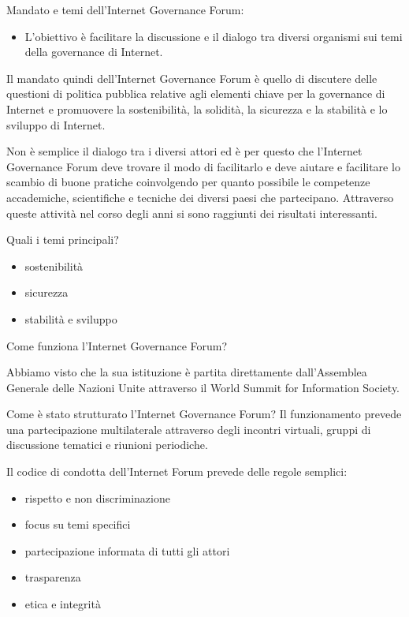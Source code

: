 Mandato e temi dell'Internet Governance Forum:
\begin{itemize}
    \item L'obiettivo è facilitare la discussione e il dialogo tra diversi organismi sui temi della governance di Internet.
\end{itemize}
Il mandato quindi dell'Internet Governance Forum è quello di discutere delle questioni di politica pubblica relative agli elementi chiave per la governance di Internet e promuovere la sostenibilità, la solidità, la sicurezza e la stabilità e lo sviluppo di Internet.\par
Non è semplice il dialogo tra i diversi attori ed è per questo che l'Internet Governance Forum deve trovare il modo di facilitarlo e deve aiutare e facilitare lo scambio di buone pratiche coinvolgendo per quanto possibile le competenze accademiche, scientifiche e tecniche dei diversi paesi che partecipano. Attraverso queste attività nel corso degli anni si sono raggiunti dei risultati interessanti.

Quali i temi principali?

\begin{itemize}
    \item sostenibilità
    \item sicurezza
    \item stabilità e sviluppo
\end{itemize}

Come funziona l'Internet Governance Forum?

Abbiamo visto che la sua istituzione è partita direttamente dall'Assemblea Generale delle Nazioni Unite attraverso il World Summit for Information Society.\par

Come è stato strutturato l'Internet Governance Forum? Il funzionamento prevede una partecipazione multilaterale attraverso degli incontri virtuali, gruppi di discussione tematici e riunioni periodiche. \par
Il codice di condotta dell'Internet Forum prevede delle regole semplici:

\begin{itemize}
    \item rispetto e non discriminazione
    \item focus su temi specifici
    \item partecipazione informata di tutti gli attori
    \item trasparenza
    \item etica e integrità
\end{itemize}

